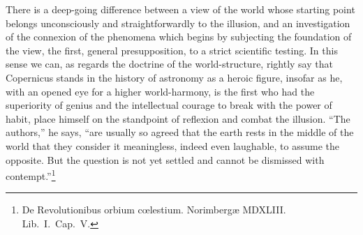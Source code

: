 \documentclass[12pt,a4paper]{book}
\begin{document}
There is a deep-going difference between a view of the world whose starting point belongs unconsciously
and straightforwardly to the illusion, and an investigation of the connexion of the phenomena which begins
by subjecting the foundation of the view, the first, general presupposition, to a strict scientific
testing. In this sense we can, as regards
the doctrine of the world-structure, rightly say that Copernicus stands in the history of astronomy as a
heroic figure, insofar as he, with an opened eye for a higher world-harmony, is the first who had the
superiority of genius and the intellectual courage to break with the power of habit, place himself on the
standpoint of reflexion and combat the illusion. ``The authors,'' he says, ``are usually so agreed that the
earth rests in the middle of the world that they consider it meaningless, indeed even laughable, to assume
the opposite. But the question is not yet settled and cannot be dismissed with
contempt.''\footnote{%
De Revolutionibus orbium cœlestium. Norimbergæ MDXLIII. Lib.\ I.\ Cap.\ V.}
\end{document}
